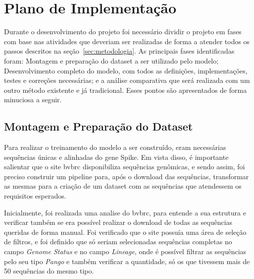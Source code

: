 
\section{Plano de Implementação}
Durante o desenvolvimento do projeto foi necessário dividir o projeto em fases com base nas atividades que deveriam ser realizadas de forma a atender todos os passos descritos na seção~\ref{sec:metodologia}. As principais fases identificadas foram: Montagem e preparação do dataset a ser utilizado pelo modelo; Desenvolvimento completo do modelo, com todos as definições, implementações, testes e correções necessárias; e a análise comparativa que será realizada com um outro método existente e já tradicional. Esses pontos são apresentados de forma minuciosa a seguir.

\subsection{Montagem e Preparação do Dataset}
Para realizar o treinamento do modelo a ser construído, eram necessárias sequências únicas e alinhadas do gene Spike. Em vista disso, é importante salientar que o site \gls{bvbrc} disponibiliza sequências genômicas, e sendo assim, foi preciso construir um pipeline para, após o download das sequências, transformar as mesmas para a criação de um dataset com as sequências que atendessem os requisitos esperados.

Inicialmente, foi realizada uma analise do \gls{bvbrc}, para entende a sua estrutura e verificar também se era possível realizar o download de todas as sequências queridas de forma manual. Foi verificado que o site possuía uma área de seleção de filtros, e foi definido que só seriam selecionadas sequências completas no campo \textit{Genome Status} e no campo \textit{Lineage}, onde é possível filtrar as sequências pelo seu tipo \textit{Pango} e também verificar a quantidade, só os que tivessem mais de 50 sequências do mesmo tipo.


